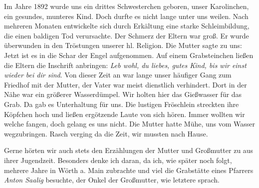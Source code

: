 \documentclass[a4paper,11pt]{article}
\begin{document}
Im Jahre 1892 wurde uns ein drittes Schwesterchen geboren, unser Karolinchen, ein gesundes, munteres Kind. Doch durfte es nicht lange unter uns weilen. Nach mehreren Monaten entwickelte sich durch Erkältung eine starke Schleimbildung, die einen baldigen Tod verursachte. Der Schmerz der Eltern war groß. Er wurde überwunden in den Tröstungen unserer hl. Religion. Die Mutter sagte zu uns: Jetzt ist es in die Schar der Engel aufgenommen. Auf einem Grabsteinchen ließen die Eltern die Inschrift anbringen: \textit{Leb wohl, du liebes, gutes Kind, bis wir einst wieder bei dir sind}.
Von dieser Zeit an war lange unser häufiger Gang zum Friedhof mit der Mutter, der Vater war meist dienstlich verhindert. Dort in der Nähe war ein größerer Wasserdümpel. Wir holten hier das Gießwasser für das Grab. Da gab es Unterhaltung für uns. Die lustigen Fröschlein streckten ihre Köpfchen hoch und ließen ergötzende Laute von sich hören. Immer wollten wir welche fangen, doch gelang es uns nicht. Die Mutter hatte Mühe, uns vom Wasser wegzubringen. Rasch verging da die Zeit, wir mussten nach Hause.

Gerne hörten wir auch stets den Erzählungen der Mutter und Großmutter zu aus ihrer Jugendzeit. Besonders denke ich daran, da ich, wie später noch folgt, mehrere Jahre in Wörth a. Main zubrachte und viel die Grabstätte eines Pfarrers \textit{Anton Saalig} besuchte, der Onkel der Großmutter, wie letztere sprach.
\end{document}
